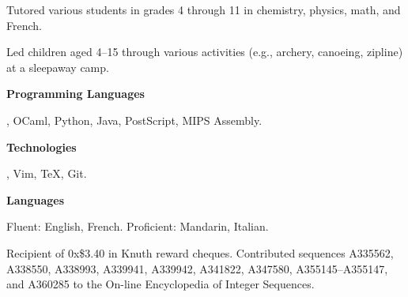 \smallskip
Tutored various students in grades 4 through 11 in chemistry, physics, math, and French.
\medbreak

\smallskip
Led children aged 4--15 through various activities (e.g., archery, canoeing, zipline) at a sleepaway camp.
\medbreak


{\bf Programming Languages}\par
\CEE, OCaml, Python, Java, PostScript, {\mc MIPS} Assembly.
\medbreak

{\bf Technologies}\par
\UNIX, Vim, \TeX, Git.
\medbreak

{\bf Languages}\par
Fluent: English, French. Proficient: Mandarin, Italian.
\medbreak


\parindent=10pt
\thing Recipient of 0x\$3.40 in Knuth reward cheques.
\smallskip
\thing Contributed sequences A335562, A338550, A338993, A339941, A339942, A341822, A347580,
A355145--A355147, and A360285
to the On-line Encyclopedia of Integer Sequences.
\medbreak

\filbreak

\bye

